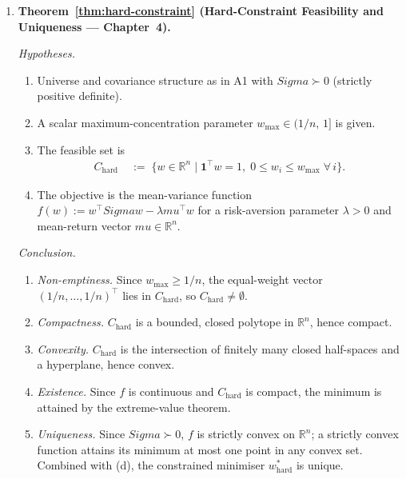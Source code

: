 \documentclass[12pt,openany]{book}
\newcommand{\R}{\mathbb{R}}
\newcommand{\bfw}{\mathbf{w}}
\newcommand{\bfmu}{\boldsymbol{\mu}}
\newcommand{\bfSigma}{\boldsymbol{\Sigma}}
\newcommand{\bfone}{\mathbf{1}}
\newcommand{\calC}{\mathcal{C}}
\numberwithin{equation}{chapter}
\theoremstyle{plain}
\theoremstyle{definition}
\theoremstyle{remark}
\def\mathcal#1{#1}%
\def\calC{C}%
\def\bfw{w}%
\def\bfmu{mu}%
\def\bfSigma{Sigma}%
\begin{document}
\begin{enumerate}[label=\textbf{B\arabic*.}, leftmargin=*, widest=B3,
                  itemsep=6pt, parsep=2pt]
        \emph{Dependencies.} A2 \eqref{eq:sum-div-bound};
        elementary real analysis (monotone functions).

  \item \textbf{Theorem~\ref{thm:hard-constraint}
        (Hard-Constraint Feasibility and Uniqueness — Chapter~4).}

        \emph{Hypotheses.}
        \begin{enumerate}[label=(\roman*), itemsep=2pt]
          \item Universe and covariance structure as in A1 with
                $\bfSigma \succ 0$ (strictly positive definite).
          \item A scalar maximum-concentration parameter
                $w_{\max} \in (1/n,\,1]$ is given.
          \item The feasible set is
                \begin{align}
                  \calC_{\mathrm{hard}}
                    &\;:=\;
                      \bigl\{
                        \bfw \in \R^n
                        \;\big|\;
                        \bfone^\top \bfw = 1,\;
                        0 \leq w_i \leq w_{\max}\;
                        \forall\, i
                      \bigr\}.
                  \label{eq:sum-hard-feas}
                \end{align}
          \item The objective is the mean-variance function
                $f(\bfw) := \bfw^\top\bfSigma\bfw - \lambda\bfmu^\top\bfw$
                for a risk-aversion parameter $\lambda > 0$ and
                mean-return vector $\bfmu \in \R^n$.
        \end{enumerate}

        \emph{Conclusion.}
        \begin{enumerate}[label=(\alph*), itemsep=2pt]
          \item \emph{Non-emptiness.}  Since $w_{\max} \geq 1/n$,
                the equal-weight vector $(1/n,\ldots,1/n)^\top$
                lies in $\calC_{\mathrm{hard}}$, so
                $\calC_{\mathrm{hard}} \neq \emptyset$.
          \item \emph{Compactness.}  $\calC_{\mathrm{hard}}$ is a
                bounded, closed polytope in $\R^n$, hence compact.
          \item \emph{Convexity.}  $\calC_{\mathrm{hard}}$ is the
                intersection of finitely many closed half-spaces and
                a hyperplane, hence convex.
          \item \emph{Existence.}  Since $f$ is continuous and
                $\calC_{\mathrm{hard}}$ is compact, the minimum is
                attained by the extreme-value theorem.
          \item \emph{Uniqueness.}  Since $\bfSigma \succ 0$,
                $f$ is strictly convex on $\R^n$; a strictly convex
                function attains its minimum at most one point in any
                convex set.  Combined with (d), the constrained
                minimiser $\bfw^*_{\mathrm{hard}}$ is unique.
        \end{enumerate}


\end{enumerate}
\end{document}
